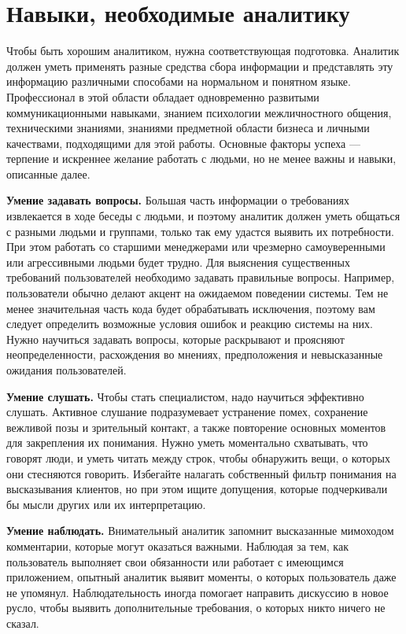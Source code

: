 \documentclass{../../text-style}
\begin{document}
\section{Навыки, необходимые аналитику}

Чтобы быть хорошим аналитиком, нужна соответствующая подготовка. Аналитик должен уметь применять разные средства сбора информации и представлять эту информацию различными способами на нормальном и понятном языке. Профессионал в этой области обладает одновременно развитыми коммуникационными навыками, знанием психологии межличностного общения, техническими знаниями, знаниями предметной области бизнеса и личными качествами, подходящими для этой работы. Основные факторы успеха --- терпение и искреннее желание работать с людьми, но не менее важны и навыки, описанные далее.

\textbf{Умение задавать вопросы.} Большая часть информации о требованиях извлекается в ходе беседы с людьми, и поэтому аналитик должен уметь общаться с разными людьми и группами, только так ему удастся выявить их потребности. При этом работать со старшими менеджерами или чрезмерно самоуверенными или агрессивными людьми будет трудно. Для выяснения существенных требований пользователей необходимо задавать правильные вопросы. Например, пользователи обычно делают акцент на ожидаемом поведении системы. Тем не менее значительная часть кода будет обрабатывать исключения, поэтому вам следует определить возможные условия ошибок и реакцию системы на них. Нужно научиться задавать вопросы, которые раскрывают и проясняют неопределенности, расхождения во мнениях, предположения и невысказанные ожидания пользователей.

\textbf{Умение слушать.} Чтобы стать специалистом, надо научиться эффективно слушать. Активное слушание подразумевает устранение помех, сохранение вежливой позы и зрительный контакт, а также повторение основных моментов для закрепления их понимания. Нужно уметь моментально схватывать, что говорят люди, и уметь читать между строк, чтобы обнаружить вещи, о которых они стесняются говорить. Избегайте налагать собственный фильтр понимания на высказывания клиентов, но при этом ищите допущения, которые подчеркивали бы мысли других или их интерпретацию.

\textbf{Умение наблюдать.} Внимательный аналитик запомнит высказанные мимоходом комментарии, которые могут оказаться важными. Наблюдая за тем, как пользователь выполняет свои обязанности или работает с имеющимся приложением, опытный аналитик выявит моменты, о которых пользователь даже не упомянул. Наблюдательность иногда помогает направить дискуссию в новое русло, чтобы выявить дополнительные требования, о которых никто ничего не сказал.
\end{document}
